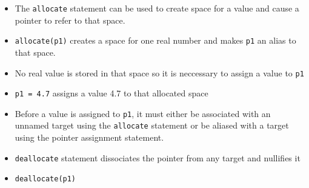\documentclass[c,mathserif,compress,xcolor=svgnames]{beamer}
\newcommand{\lstfortran}[1]{\lstinline[language={[90]Fortran},basicstyle=\footnotesize\ttfamily]|#1|}
\begin{document}
\begin{frame}
  \begin{itemize}
    \item The \lstfortran{allocate} statement can be used to create space for a value and cause a pointer to refer to that space.
    \item[] \lstfortran{allocate(p1)} creates a space for one real number and makes \lstfortran{p1} an alias to that space.
    \item No real value is stored in that space so it is neccessary to assign a value to \lstfortran{p1}
    \item \lstfortran{p1 = 4.7} assigns a value 4.7 to that allocated space
    \item Before a value is assigned to \lstfortran{p1}, it must either be associated with an unnamed target using the \lstfortran{allocate} statement or be aliased with a target using the pointer assignment statement.
    \item \lstfortran{deallocate} statement dissociates the pointer from any target and nullifies it
    \item[] \lstfortran{deallocate(p1)}
  \end{itemize}
\end{frame}
\end{document}
